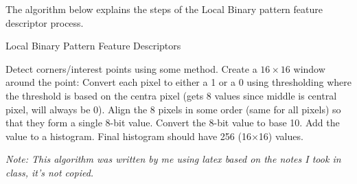\documentclass{assignment-x}
\begin{document}
The algorithm below explains the steps of the Local Binary pattern feature descriptor process.
\begin{algorithm}
    \caption{Local Binary Pattern Feature Descriptors}
    \label{alg:corner_detection}
    \begin{algorithmic}[1]
        \State Detect corners/interest points using some method.
            \State Create a $16 \times 16$ window around the point:
                    \State Convert each pixel to either a 1 or a 0 using thresholding where the threshold is based on the centra pixel (gets 8 values since middle is central pixel, will always be 0).
                \EndFor
                \State Align the 8 pixels in some order (same for all pixels) so that they form a single 8-bit value.
                \State Convert the 8-bit value to base 10.
                \State Add the value to a histogram.
            \EndFor
        \EndFor
        \State Final histogram should have 256 (16$\times$16) values.
    \end{algorithmic}
    \end{algorithm}

\textit{Note: This algorithm was written by me using latex based on the notes I took in class, it's not copied.}
\end{document}
